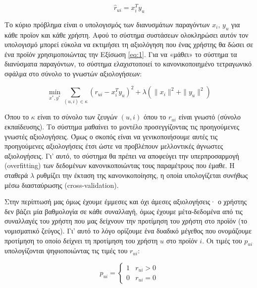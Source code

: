 \begin{equation}
	\hat{r}_{ui}=x_i^Ty_u\label{eq:1}
\end{equation}

Το κύριο πρόβλημα είναι ο υπολογισμός των διανυσμάτων παραγόντων $x_i$, $y_u$ για κάθε προϊον και κάθε χρήστη. Αφού το σύστημα συστάσεων ολοκληρώσει αυτόν τον υπολογισμό μπορεί εύκολα να εκτιμήσει τη αξιολόγηση που ένας χρήστης θα δώσει σε ένα προϊόν χρησιμοποιώντας την Εξίσωση \eqref{eq:1}. Για να «μάθει» το σύστημα τα διανύσματα παραγόντων, το σύστημα ελαχιστοποιεί το κανονικοποιημένο τετραγωνικό σφάλμα στο σύνολο το γνωστών αξιολογήσεων:

\begin{equation}
	\min_{x^*,y^*}\sum_{(u,i) \in \kappa} \left(r_{ui}-x_i^Ty_u \right)^2+\lambda\left(\|x_i\|^2+\|y_u\|^2\right)\label{eq:2}
\end{equation}

Όπου το $\kappa$ είναι το σύνολο των ζευγών $(u,i)$ όπου το $r_{ui}$ είναι γνωστό (σύνολο εκπαίδευσης). Το σύστημα μαθαίνει το μοντέλο προσεγγίζοντας τις προηγούμενες γνωστές αξιολογήσεις. Όμως ο σκοπός είναι να γενικοποιήσουμε αυτές τις προηγούμενες αξιολογήσεις έτσι ώστε να προβλέπουν μελλοντικές άγνωστες αξιολογήσεις. Γι’ αυτό, το σύστημα θα πρέπει να αποφεύγει την υπερπροσαρμογή (overfitting) των δεδομένων κανονικοποιώντας τους παραμέτρους που έμαθε. Η σταθερά $\lambda$ ρυθμίζει την έκταση της κανονικοποίησης, η οποία υπολογίζεται συνήθως μέσω διασταύρωσης (cross-validation).

Στην περίπτωσή μας όμως έχουμε έμμεσες και όχι άμεσες αξιολογήσεις· ο χρήστης δεν βάζει μία βαθμολογία σε κάθε συναλλαγή, όμως έχουμε μέτα-δεδομένα από τις συναλλαγές του χρήστη που μας δείχνουν την προτίμηση του χρήστη στο προϊόν (το νομισματικό ζεύγος). Γι’ αυτό το λόγο ορίζουμε ένα δυαδικό μέγεθος που ονομάζουμε προτίμηση  το οποίο δείχνει τη προτίμηση του χρήστη $u$ στο προϊόν $i$. Οι τιμές του $p_{ui}$ υπολογίζονται ψηφιοποιώντας τις τιμές του $r_{ui}$:

\begin{equation*}
	p_{ui}= \begin{cases}
		1 & r_{ui}>0 \\
		0 & r_{ui}=0
	\end{cases}
\end{equation*}

